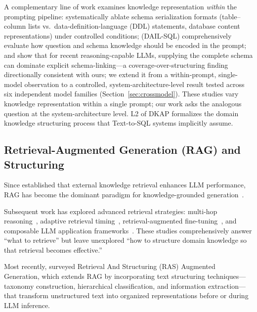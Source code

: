 \documentclass[fleqn,10pt,lineno]{wlpeerj}
\begin{document}
A complementary line of work examines knowledge representation \textit{within} the prompting pipeline: \citet{chang2023prompt} systematically ablate schema serialization formats (table--column lists vs.\ data-definition-language (DDL) statements, database content representations) under controlled conditions; \citet{dailsql} (DAIL-SQL) comprehensively evaluate how question and schema knowledge should be encoded in the prompt; and \citet{maamari2024death} show that for recent reasoning-capable LLMs, supplying the complete schema can dominate explicit schema-linking---a coverage-over-structuring finding directionally consistent with ours; we extend it from a within-prompt, single-model observation to a controlled, system-architecture-level result tested across six independent model families (Section~\ref{sec:crossmodel}). These studies vary knowledge representation within a single prompt; our work asks the analogous question at the system-architecture level. L2 of DKAP formalizes the domain knowledge structuring process that Text-to-SQL systems implicitly assume.

\subsection{Retrieval-Augmented Generation (RAG) and Structuring}

Since \citet{lewis2020rag} established that external knowledge retrieval enhances LLM performance, RAG has become the dominant paradigm for knowledge-grounded generation~\citep{gao2024rag,fan2024survey}.

Subsequent work has explored advanced retrieval strategies: multi-hop reasoning~\citep{chen2019multihop}, adaptive retrieval timing~\citep{selfrag}, retrieval-augmented fine-tuning~\citep{radit}, and composable LLM application frameworks~\citep{chase2025langchain}. These studies comprehensively answer ``what to retrieve'' but leave unexplored ``how to structure domain knowledge so that retrieval becomes effective.''

Most recently, \citet{jiang2025ras} surveyed Retrieval And Structuring (RAS) Augmented Generation, which extends RAG by incorporating text structuring techniques---taxonomy construction, hierarchical classification, and information extraction---that transform unstructured text into organized representations before or during LLM inference.
\end{document}
